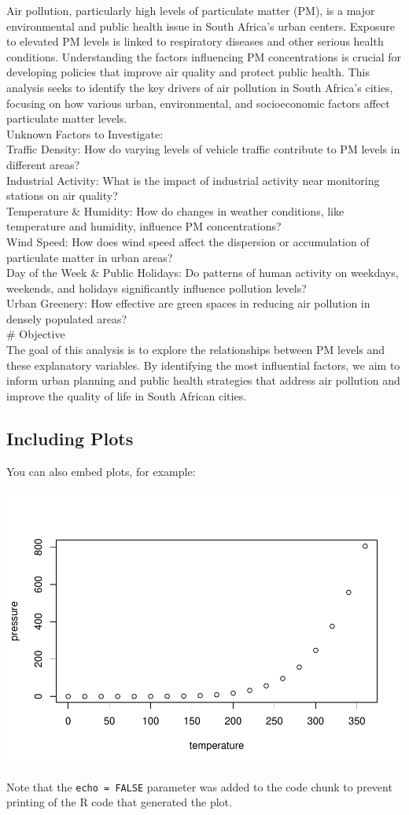 \documentclass[12pt,halfline,a4paper,]{ouparticle}
\begin{document}
Air pollution, particularly high levels of particulate matter (PM), is a
major environmental and public health issue in South Africa's urban
centers. Exposure to elevated PM levels is linked to respiratory
diseases and other serious health conditions. Understanding the factors
influencing PM concentrations is crucial for developing policies that
improve air quality and protect public health. This analysis seeks to
identify the key drivers of air pollution in South Africa's cities,
focusing on how various urban, environmental, and socioeconomic factors
affect particulate matter levels.\\
Unknown Factors to Investigate:\\
Traffic Density: How do varying levels of vehicle traffic contribute to
PM levels in different areas?\\
Industrial Activity: What is the impact of industrial activity near
monitoring stations on air quality?\\
Temperature \& Humidity: How do changes in weather conditions, like
temperature and humidity, influence PM concentrations?\\
Wind Speed: How does wind speed affect the dispersion or accumulation of
particulate matter in urban areas?\\
Day of the Week \& Public Holidays: Do patterns of human activity on
weekdays, weekends, and holidays significantly influence pollution
levels?\\
Urban Greenery: How effective are green spaces in reducing air pollution
in densely populated areas?\\
\# Objective\\
The goal of this analysis is to explore the relationships between PM
levels and these explanatory variables. By identifying the most
influential factors, we aim to inform urban planning and public health
strategies that address air pollution and improve the quality of life in
South African cities.

\hypertarget{including-plots}{%
\subsection{Including Plots}\label{including-plots}}

You can also embed plots, for example:

\includegraphics{Report_files/figure-latex/pressure-1.pdf}

Note that the \texttt{echo\ =\ FALSE} parameter was added to the code
chunk to prevent printing of the R code that generated the plot.
\end{document}
